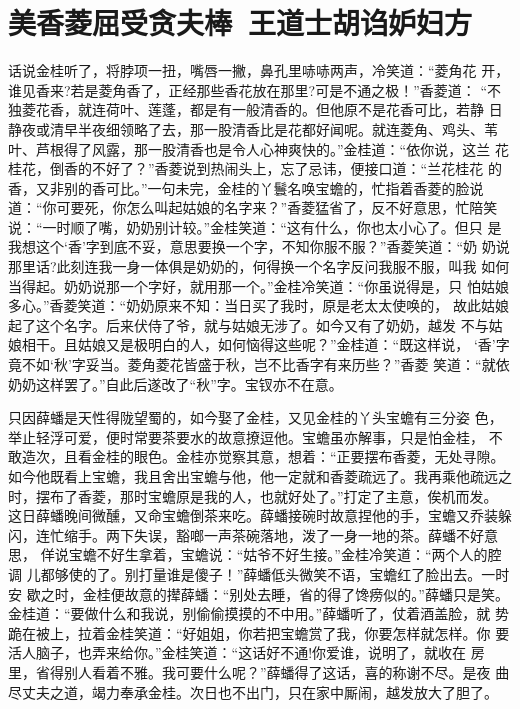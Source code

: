 \chapter{美香菱屈受贪夫棒~王道士胡诌妒妇方}

话说金桂听了，将脖项一扭，嘴唇一撇，鼻孔里哧哧两声，冷笑道：“菱角花
开，谁见香来?若是菱角香了，正经那些香花放在那里?可是不通之极！”香菱道：
“不独菱花香，就连荷叶、莲蓬，都是有一般清香的。但他原不是花香可比，若静
日静夜或清早半夜细领略了去，那一股清香比是花都好闻呢。就连菱角、鸡头、苇
叶、芦根得了风露，那一股清香也是令人心神爽快的。”金桂道：“依你说，这兰
花桂花，倒香的不好了？”香菱说到热闹头上，忘了忌讳，便接口道：“兰花桂花
的香，又非别的香可比。”一句未完，金桂的丫鬟名唤宝蟾的，忙指着香菱的脸说
道：“你可要死，你怎么叫起姑娘的名字来？”香菱猛省了，反不好意思，忙陪笑
说：“一时顺了嘴，奶奶别计较。”金桂笑道：“这有什么，你也太小心了。但只
是我想这个‘香’字到底不妥，意思要换一个字，不知你服不服？”香菱笑道：“奶
奶说那里话?此刻连我一身一体俱是奶奶的，何得换一个名字反问我服不服，叫我
如何当得起。奶奶说那一个字好，就用那一个。”金桂冷笑道：“你虽说得是，只
怕姑娘多心。”香菱笑道：“奶奶原来不知：当日买了我时，原是老太太使唤的，
故此姑娘起了这个名字。后来伏侍了爷，就与姑娘无涉了。如今又有了奶奶，越发
不与姑娘相干。且姑娘又是极明白的人，如何恼得这些呢？”金桂道：“既这样说，
‘香’字竟不如‘秋’字妥当。菱角菱花皆盛于秋，岂不比香字有来历些？”香菱
笑道：“就依奶奶这样罢了。”自此后遂改了“秋”字。宝钗亦不在意。

只因薛蟠是天性得陇望蜀的，如今娶了金桂，又见金桂的丫头宝蟾有三分姿
色，举止轻浮可爱，便时常要茶要水的故意撩逗他。宝蟾虽亦解事，只是怕金桂，
不敢造次，且看金桂的眼色。金桂亦觉察其意，想着：“正要摆布香菱，无处寻隙。
如今他既看上宝蟾，我且舍出宝蟾与他，他一定就和香菱疏远了。我再乘他疏远之
时，摆布了香菱，那时宝蟾原是我的人，也就好处了。”打定了主意，俟机而发。
这日薛蟠晚间微醺，又命宝蟾倒茶来吃。薛蟠接碗时故意捏他的手，宝蟾又乔装躲
闪，连忙缩手。两下失误，豁啷一声茶碗落地，泼了一身一地的茶。薛蟠不好意思，
佯说宝蟾不好生拿着，宝蟾说：“姑爷不好生接。”金桂冷笑道：“两个人的腔调
儿都够使的了。别打量谁是傻子！”薛蟠低头微笑不语，宝蟾红了脸出去。一时安
歇之时，金桂便故意的撵薛蟠：“别处去睡，省的得了馋痨似的。”薛蟠只是笑。
金桂道：“要做什么和我说，别偷偷摸摸的不中用。”薛蟠听了，仗着酒盖脸，就
势跪在被上，拉着金桂笑道：“好姐姐，你若把宝蟾赏了我，你要怎样就怎样。你
要活人脑子，也弄来给你。”金桂笑道：“这话好不通!你爱谁，说明了，就收在
房里，省得别人看着不雅。我可要什么呢？”薛蟠得了这话，喜的称谢不尽。是夜
曲尽丈夫之道，竭力奉承金桂。次日也不出门，只在家中厮闹，越发放大了胆了。

